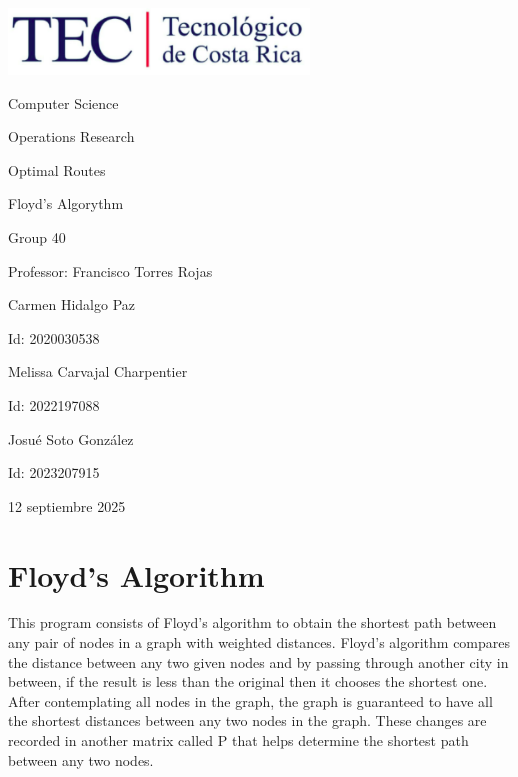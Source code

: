 \documentclass{article}
\begin{document}
\begin{titlepage}
    \centering
    \includegraphics[width=0.6\textwidth]{logo-tec.png}\par\vspace{1cm}

    {\large Computer Science\par}
    {\large Operations Research\par}
    \vspace{2cm}

    {\Large Optimal Routes\par}
    {\large Floyd's Algorythm\par}
    \vspace{2cm}

    {\large Group 40\par}
    {\large Professor: Francisco Torres Rojas\par}
    \vspace{3cm}

    {\large Carmen Hidalgo Paz\par}
    {\large Id: 2020030538\par}
    \vspace{1cm}
    {\large Melissa Carvajal Charpentier\par}
    {\large Id: 2022197088\par}
    \vspace{1cm}
    {\large Josué Soto González\par}
    {\large Id: 2023207915\par}
    \vspace{1cm}

    {\large 12 septiembre 2025\par}
\end{titlepage}

\newpage


\section{Floyd's Algorithm}
This program consists of Floyd's algorithm to obtain the shortest path between any pair of nodes in a graph with weighted distances.
Floyd's algorithm compares the distance between any two given nodes and by passing through another city in between, if the result is less than the original then it chooses the shortest one. After contemplating all nodes in the graph, the graph is guaranteed to have all the shortest distances between any two nodes in the graph. These changes are recorded in another matrix called P that helps determine the shortest path between any two nodes.
\end{document}
